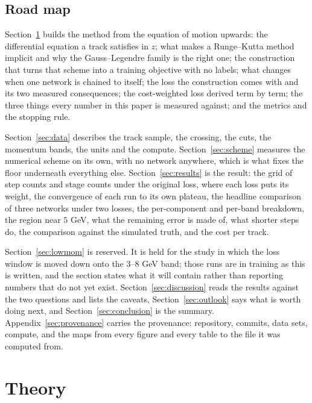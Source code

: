 \documentclass[11pt,a4paper]{article}
\begin{document}
\subsection{Road map}
\label{sec:intro-roadmap}

Section~\ref{sec:theory} builds the method from the equation of motion upwards:
the differential equation a track satisfies in $z$; what makes a Runge--Kutta
method implicit and why the Gauss--Legendre family is the right one; the
construction that turns that scheme into a training objective with no labels;
what changes when one network is chained to itself; the loss the construction
comes with and its two measured consequences; the cost-weighted loss derived
term by term; the three things every number in this paper is measured against;
and the metrics and the stopping rule.

Section~\ref{sec:data} describes the track sample, the crossing, the cuts, the
momentum bands, the units and the compute. Section~\ref{sec:scheme} measures
the numerical scheme on its own, with no network anywhere, which is what fixes
the floor underneath everything else. Section~\ref{sec:results} is the result:
the grid of step counts and stage counts under the original loss, where each
loss puts its weight, the convergence of each run to its own plateau, the
headline comparison of three networks under two losses, the per-component and
per-band breakdown, the region near $5$ GeV, what the remaining error is made
of, what shorter steps do, the comparison against the simulated truth, and the
cost per track.

Section~\ref{sec:lowmom} is reserved. It is held for the study in which the
loss window is moved down onto the $3$--$8$ GeV band; those runs are in
training as this is written, and the section states what it will contain rather
than reporting numbers that do not yet exist. Section~\ref{sec:discussion}
reads the results against the two questions and lists the caveats,
Section~\ref{sec:outlook} says what is worth doing next, and
Section~\ref{sec:conclusion} is the summary. Appendix~\ref{sec:provenance}
carries the provenance: repository, commits, data sets, compute, and the maps
from every figure and every table to the file it was computed from.

\section{Theory}
\label{sec:theory}
\end{document}

